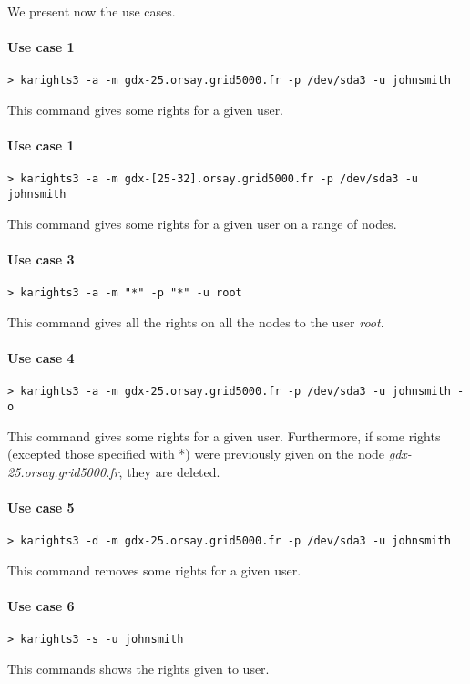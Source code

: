 \documentclass[a4wide,10pt,oneside]{book}
\begin{document}
We present now the use cases.
\paragraph{Use case 1}
\begin{verbatim}
> karights3 -a -m gdx-25.orsay.grid5000.fr -p /dev/sda3 -u johnsmith
\end{verbatim}
This command gives some rights for a given user.

\paragraph{Use case 1}
\begin{verbatim}
> karights3 -a -m gdx-[25-32].orsay.grid5000.fr -p /dev/sda3 -u johnsmith
\end{verbatim}
This command gives some rights for a given user on a range of nodes.

\paragraph{Use case 3}
\begin{verbatim}
> karights3 -a -m "*" -p "*" -u root
\end{verbatim}
This command gives all the rights on all the nodes to the user \textit{root}.

\paragraph{Use case 4}
\begin{verbatim}
> karights3 -a -m gdx-25.orsay.grid5000.fr -p /dev/sda3 -u johnsmith -o
\end{verbatim}
This command gives some rights for a given user. Furthermore, if some rights (excepted those specified with *) were previously given on the node \textit{gdx-25.orsay.grid5000.fr}, they are deleted.

\paragraph{Use case 5}
\begin{verbatim}
> karights3 -d -m gdx-25.orsay.grid5000.fr -p /dev/sda3 -u johnsmith
\end{verbatim}
This command removes some rights for a given user.

\paragraph{Use case 6}
\begin{verbatim}
> karights3 -s -u johnsmith
\end{verbatim}
This commands shows the rights given to user.
\end{document}
